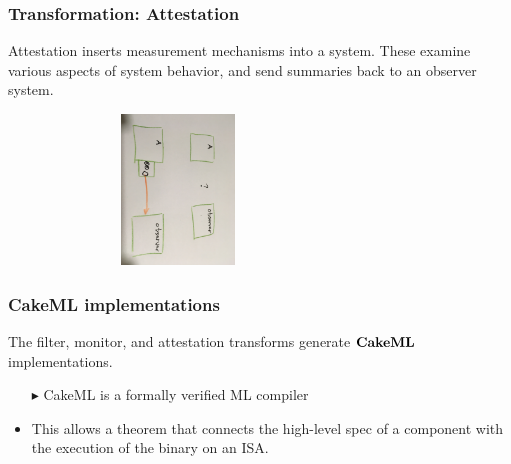 \documentclass{beamer}
\newcommand{\konst}[1]{\ensuremath{\mbox{\bf{#1}}}}
\begin{document}
\begin{frame}\frametitle{Transformation: Attestation}

Attestation inserts measurement mechanisms into a system. These
examine various aspects of system behavior, and send summaries back to
an observer system.





\hspace*{10mm}\includegraphics[width=90mm,height=40mm]{att.jpg}


\end{frame}

\begin{frame}\frametitle{CakeML implementations}

  The filter, monitor, and attestation transforms generate \konst{CakeML} implementations.

\begin{itemize}
 \item [$\blacktriangleright$] CakeML is a formally verified ML compiler

\item This allows a theorem that connects the high-level spec of a
  component with the execution of the binary on an ISA.
\end{itemize}

\end{frame}
\end{document}
